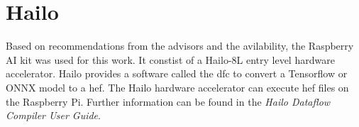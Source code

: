 \chapter{Hailo}

Based on recommendations from the advisors and the avilability, the Raspberry AI kit was used for this work.
It constist of a Hailo-8L entry level hardware accelerator.
Hailo provides a software called the \Acrfull{dfc} to convert a Tensorflow or ONNX model to a \Acrfull{hef}.
The Hailo hardware accelerator can execute \acrshort{hef} files on the Raspberry Pi.
Further information can be found in the \textit{Hailo Dataflow Compiler User Guide}.